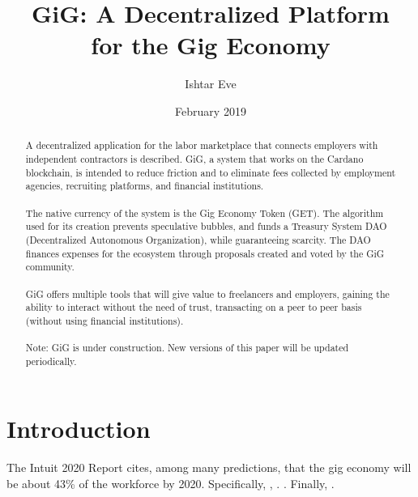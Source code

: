 \documentclass{article}
\title{GiG: A Decentralized Platform\\for the Gig Economy}
\author{Ishtar Eve}
\date{February 2019}
\begin{document}
\maketitle

\begin{abstract}
A decentralized application for the labor marketplace that connects employers with independent contractors is described. GiG, a system that works on the Cardano blockchain, is intended to reduce friction and to eliminate fees collected by employment agencies, recruiting platforms, and financial institutions. 

\paragraph{} The native currency of the system is the Gig Economy Token (GET). The algorithm used for its creation prevents speculative bubbles, and funds a Treasury System DAO (Decentralized Autonomous Organization), while guaranteeing scarcity. The DAO finances expenses for the ecosystem through proposals created and voted by the GiG community.

\paragraph{} GiG offers multiple tools that will give value to freelancers and employers, gaining the ability to interact without the need of trust, transacting on a peer to peer basis (without using financial institutions).

\paragraph{} Note: GiG is under construction. New versions of this paper will be updated periodically.

\end{abstract}

\newpage
\tableofcontents
\newpage

\section{Introduction}

The Intuit 2020 Report\cite{intuit-2020-report} cites, among many predictions, that the gig economy will be about 43\% of the workforce by 2020. Specifically, , . . Finally, .
\end{document}
